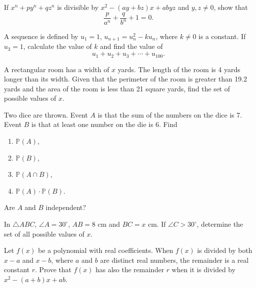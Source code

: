 \begin{problems}
    \problem[fixed] If $x^{n} + py^{n} + qz^{n}$ is divisible by $x^2 - (ay + bz)x +
    abyz$ and $y, z \ne 0$, show that 
    \[\frac{p}{a^n} + \frac{q}{b^n} + 1 = 0.\] 

    \problem A sequence is defined by $u_{1} = 1$, $u_{n + 1} = u_{n}^2 -
    ku_{n}$, where $k \ne 0$ is a constant. If $u_{3} = 1$, calculate the value
    of $k$ and find the value of
    \[u_{1} + u_{2} + u_{3} + \cdots + u_{100}.\] 

    \problem A rectangular room has a width of $x$ yards. The length of the room
    is 4 yards longer than its width. Given that the perimeter of the room is
    greater than 19.2 yards and the area of the room is less than 21 square
    yards, find the set of possible values of $x$. 

    \problem Two dice are thrown. Event $A$ is that the sum of the numbers on
    the dice is 7. Event $B$ is that at least one number on the die is 6. Find 
    \begin{enumerate}
        \item $\mathbb{P}(A)$, 
        
        \item $\mathbb{P}(B)$,
        
        \item $\mathbb{P}(A \cap B)$, 
        
        \item $\mathbb{P}(A) \cdot \mathbb{P}(B)$.
    \end{enumerate}
    Are $A$ and $B$ independent? 

    \problem In $\triangle ABC$, $\angle A = 30^\circ$, $AB = 8$ cm and $BC = x$
    cm. If $\angle C > 30^\circ$, determine the set of all possible values of
    $x$. 

    \problem[fixed] Let $f(x)$ be a polynomial with real coefficients. When $f(x)$ is
    divided by both $x - a$ and $x - b$, where $a$ and $b$ are distinct real
    numbers, the remainder is a real constant $r$. Prove that $f(x)$ has also
    the remainder $r$ when it is divided by $x^2 - (a + b)x + ab$. 


\end{problems}
